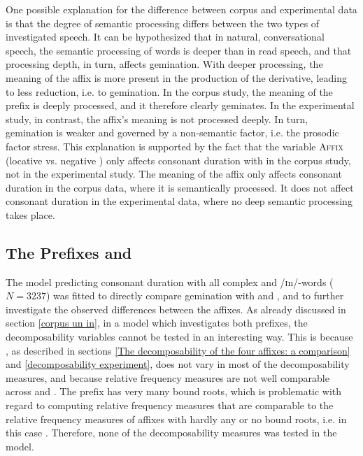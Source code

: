 One possible explanation for the difference between corpus and experimental data is that the degree of semantic processing differs between the two types of investigated speech. It can be hypothesized that in natural, conversational speech,  the semantic processing of words is deeper than in read speech, and that processing depth, in turn, affects gemination. With deeper processing, the meaning of the affix is more present in the production of the derivative, leading to less reduction, i.e. to gemination. 
 In the corpus study, the meaning of the prefix is deeply processed, and it therefore clearly geminates. In the experimental study, in contrast, the affix's meaning is not processed deeply. In turn, gemination is weaker and governed by a non-semantic factor,  i.e. the prosodic factor stress.
  This explanation is supported by the fact that the variable \textsc{Affix} (locative  vs. negative ) only affects consonant duration with  in the corpus study, not in the experimental study. The meaning of the affix only affects consonant duration in the corpus data, where it is semantically processed. It does not affect consonant duration in the experimental data, where no deep semantic processing takes place.





\subsection{The Prefixes  and }

The model predicting consonant duration with all complex  and /ɪn/-words ($N=3237$) was fitted to directly compare gemination with  and , and to further investigate the observed differences between the affixes.
As already discussed in section \ref{corpus un in}, in a model which investigates both prefixes, the decomposability variables cannot be tested in an interesting way. This is because , as described in sections \ref{The decomposability of the four affixes: a comparison} and \ref{decomposability experiment}, does not vary in most of the decomposability measures, and because relative frequency measures are not well comparable across  and . The prefix  has very many bound roots, which is problematic with regard to computing relative frequency measures that are comparable to the relative frequency measures of affixes with hardly any or no bound roots, i.e. in this case . Therefore, none of the decomposability measures was tested in the model. 

